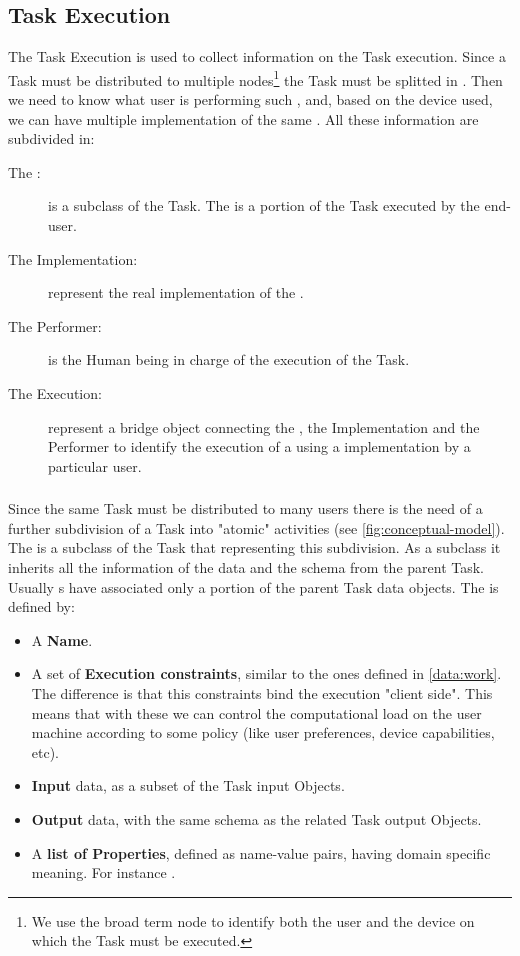 \subsection{Task Execution}
The Task Execution is used to collect information on the Task execution. Since
a Task must be distributed to multiple nodes\footnote{We use the broad term node
to identify both the user and the device on which the Task must be executed.} the
Task must be splitted in \utask{}. Then we need to know what user is performing
such \utask{}, and, based on the device used, we can have multiple implementation
of the same \utask{}. All these information are subdivided in:
\begin{description}
    \item[The \utask{}:] is a subclass of the Task. The \utask{} is a portion
    of the Task executed by the end-user.
    \item[The \utask{} Implementation:] represent the real implementation
    of the \utask{}.
    \item[The Performer:] is the Human being in charge of the execution of the
    Task.
    \item[The Execution:] represent a bridge object connecting the \utask{},
    the \utask{} Implementation and the Performer to identify the execution of a
    \utask{} using a \utask{} implementation by a particular user.
\end{description}


\subsubsection{\utask{}}
Since the same Task must be distributed to many users there is the need of a
further subdivision of a Task into "atomic" activities (see
\autoref{fig:conceptual-model}).
The \utask{} is a subclass of the Task that representing this subdivision. As
a subclass it inherits all the information of the data and the schema from the
parent Task. Usually \utask{}s have associated only a portion of the parent
Task data objects. The \utask{} is defined by:
\begin{itemize}
    \item A \textbf{Name}.
    
    \item A set of \textbf{Execution constraints}, similar to the ones defined
    in \ref{data:work}. The difference is that this constraints bind the
    execution "client side". This means that with these we can control the
    computational load on the user machine according to some policy (like
    user preferences, device capabilities, etc).
    
    \item \textbf{Input} data, as a subset of the Task input Objects.
    \item \textbf{Output} data, with the same schema as the related Task output
    Objects.
    
    \item A \textbf{list of Properties}, defined as name-value pairs, having
    domain specific meaning. For instance .
\end{itemize}

